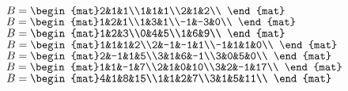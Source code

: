 \begin{Exercise}[
name={},
title={}, 
difficulty=0,
origin={\cite{GH}}]
\begin{multicols}{2}
\Question $B = \begin{mat}2&1&1\\1&1&1\\2&1&2\\ \end{mat}$
\Question $B = \begin{mat}1&2&1\\1&3&1\\-1&-3&0\\ \end{mat}$
\Question $B = \begin{mat}1&2&3\\0&4&5\\1&6&9\\ \end{mat}$
\Question $B = \begin{mat}1&1&1&2\\2&-1&-1&1\\-1&1&1&0\\ \end{mat}$
\Question $B = \begin{mat}2&-1&1&5\\3&1&6&-1\\3&0&5&0\\ \end{mat}$
\Question $B = \begin{mat}1&1&-1&7\\2&1&0&10\\3&2&-1&17\\ \end{mat}$
\Question $B = \begin{mat}4&1&8&15\\1&1&2&7\\3&1&5&11\\ \end{mat}$
\EndCurrentQuestion
\end{multicols}
\end{Exercise}

